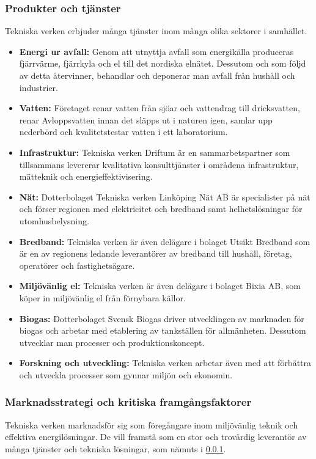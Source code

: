 \documentclass[10pt,a4paper]{article}
\begin{document}
\subsubsection{Produkter och tjänster} \label{prod}
Tekniska verken erbjuder många tjänster inom många olika sektorer i samhället.
\begin{itemize}
	\item \textbf{Energi ur avfall:} Genom att utnyttja avfall som energikälla
	produceras fjärrvärme, fjärrkyla och el till det nordiska elnätet. Dessutom och
	som följd av detta återvinner, behandlar och deponerar man avfall från hushåll
	och industrier.
	\item \textbf{Vatten:} Företaget renar vatten från sjöar och vattendrag till
	dricksvatten, renar Avloppsvatten innan det släpps ut i naturen igen, samlar
	upp nederbörd och kvalitetstestar vatten i ett laboratorium.
	\item \textbf{Infrastruktur:} Tekniska verken Driftum är en sammarbetspartner
	som tillsammans levererar kvalitativa konsulttjänster i områdena infrastruktur,
	mätteknik och energieffektivisering.
	\item \textbf{Nät:} Dotterbolaget Tekniska verken Linköping Nät AB är
	specialister på nät och förser regionen med elektricitet och bredband samt
	helhetslösningar för utomhusbelysning.
	\item \textbf{Bredband:} Tekniska verken är även delägare i bolaget Utsikt
	Bredband som är en av regionens ledande leverantörer av bredband till hushåll,
	företag, operatörer och fastighetsägare.
	\item \textbf{Miljövänlig el:} Tekniska verken är även delägare i bolaget Bixia
	AB, som köper in miljövänlig el från förnybara källor.
	\item \textbf{Biogas:} Dotterbolaget Svensk Biogas driver utvecklingen av
	marknaden för biogas och arbetar med etablering av tankställen för allmänheten.
	Dessutom utvecklar man processer och produktionskoncept.
	\item \textbf{Forskning och utveckling:} Tekniska verken arbetar även med att
	förbättra och utveckla processer som gynnar miljön och ekonomin.
\end{itemize}

\subsubsection{Marknadsstrategi och kritiska framgångsfaktorer}
Tekniska verken marknadsför sig som föregångare inom miljövänlig teknik och
effektiva energilösningar. De vill framstå som en stor och trovärdig leverantör 
av många tjänster och tekniska lösningar, som nämnts i \ref{prod}. 
\end{document}
